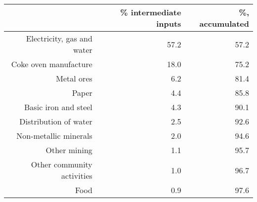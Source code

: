 \begin{table}[ht]
\centering
\begin{tabular}{rrr}
  \hline
 & \% intermediate inputs & \%, accumulated \\ 
  \hline
Electricity, gas and water & 57.2 & 57.2 \\ 
  Coke oven manufacture & 18.0 & 75.2 \\ 
  Metal ores & 6.2 & 81.4 \\ 
  Paper & 4.4 & 85.8 \\ 
  Basic iron and steel & 4.3 & 90.1 \\ 
  Distribution of water & 2.5 & 92.6 \\ 
  Non-metallic minerals & 2.0 & 94.6 \\ 
  Other mining & 1.1 & 95.7 \\ 
  Other community activities & 1.0 & 96.7 \\ 
  Food & 0.9 & 97.6 \\ 
   \hline
\end{tabular}
\end{table}

